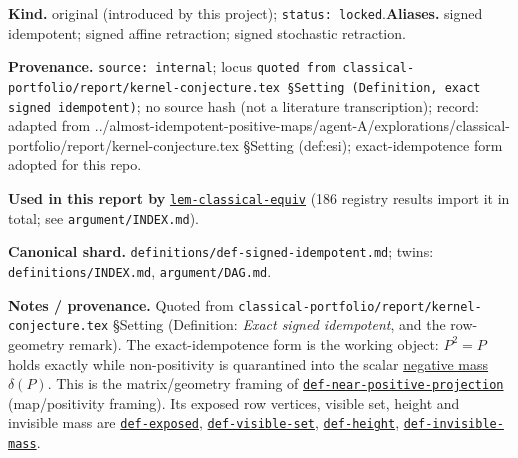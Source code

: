 \begin{defnote}
\textbf{Kind.} original (introduced by this project); \texttt{status: locked}.\quad\textbf{Aliases.} signed idempotent; signed affine retraction; signed stochastic retraction.
\par
\textbf{Provenance.} \texttt{source: internal}; locus \texttt{quoted from classical-\allowbreak{}portfolio/\allowbreak{}report/\allowbreak{}kernel-\allowbreak{}conjecture.\allowbreak{}tex \S{}Setting (Definition,\allowbreak{} exact signed idempotent)}; no source hash (not a literature transcription); record: adapted from ..\allowbreak{}/\allowbreak{}almost-\allowbreak{}idempotent-\allowbreak{}positive-\allowbreak{}maps/\allowbreak{}agent-\allowbreak{}A/\allowbreak{}explorations/\allowbreak{}classical-\allowbreak{}portfolio/\allowbreak{}report/\allowbreak{}kernel-\allowbreak{}conjecture.\allowbreak{}tex \S{}Setting (def:\allowbreak{}esi);\allowbreak{} exact-\allowbreak{}idempotence form adopted for this repo.
\par
\textbf{Used in this report by} \hyperref[lem:classical-equiv]{\texttt{lem-\allowbreak{}classical-\allowbreak{}equiv}} (186 registry results import it in total; see \texttt{argument/INDEX.md}).
\par
\textbf{Canonical shard.} \texttt{definitions/\allowbreak{}def-\allowbreak{}signed-\allowbreak{}idempotent.\allowbreak{}md}; twins: \texttt{definitions/INDEX.md}, \texttt{argument/DAG.md}.
\par
\textbf{Notes / provenance.} Quoted from \texttt{classical-\allowbreak{}portfolio/\allowbreak{}report/\allowbreak{}kernel-\allowbreak{}conjecture.\allowbreak{}tex} \S{}Setting
(Definition: \emph{Exact signed idempotent}, and the row-geometry remark). The exact-idempotence form is the
working object: $P^2=P$ holds exactly while non-positivity is quarantined into the scalar
\hyperref[def:negative-mass]{negative mass} $\delta(P)$. This is the matrix/geometry framing of
\hyperref[def:near-positive-projection]{\texttt{def-\allowbreak{}near-\allowbreak{}positive-\allowbreak{}projection}} (map/positivity framing). Its exposed row vertices, visible set, height
and invisible mass are \hyperref[def:exposed]{\texttt{def-\allowbreak{}exposed}}, \hyperref[def:visible-set]{\texttt{def-\allowbreak{}visible-\allowbreak{}set}}, \hyperref[def:height]{\texttt{def-\allowbreak{}height}}, \hyperref[def:invisible-mass]{\texttt{def-\allowbreak{}invisible-\allowbreak{}mass}}.
\end{defnote}

